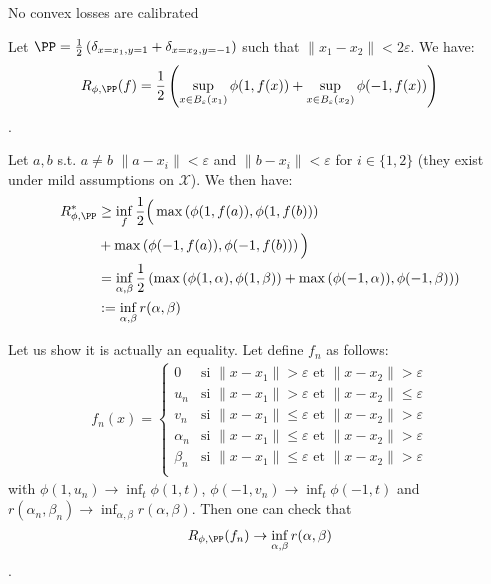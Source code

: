 \begin{prop}
No convex losses are calibrated
\end{prop}
\begin{prv*}

Let $\PP= \frac{1}{2}\left(\delta_{x=x_1,y=1}+\delta_{x=x_2,y=-1}\right)$ such that $\lVert x_1-x_2\rVert<2\varepsilon$. We have:
$$R_{\phi,\PP}(f) = \frac{1}{2}\left(\sup_{x\in B_\varepsilon(x_1)}\phi(1,f(x))+\sup_{x\in B_\varepsilon(x_2)}\phi(-1,f(x))\right)$$.

Let $a,b$ s.t. $a\neq b$  $\lVert a-x_i\rVert<\varepsilon$ and  $\lVert b-x_i\rVert<\varepsilon$ for $i\in\{1,2\}$ (they exist under mild assumptions on $\mathcal{X}$). We then have: 
\begin{align*}
R^*_{\phi,\PP} & \geq \inf_{f} \frac{1}{2}\Big(\max\left(\phi(1,f(a)),\phi(1,f(b))\right)\\
&+
\max\left(\phi(-1,f(a)),\phi(-1,f(b))\right)\Big)\\
&=  \inf_{\alpha,\beta} \frac{1}{2}\left(\max\left(\phi(1,\alpha),\phi(1,\beta)\right)+\max\left(\phi(-1,\alpha)),\phi(-1,\beta)\right)\right)\\
&:= \inf_{\alpha,\beta} r(\alpha,\beta)
\end{align*}

Let us show it is actually an equality. Let define $f_n$ as follows:
\begin{align*}
    f_n(x) = \left\{
    \begin{array}{ll}
        0 & \mbox{si } \lVert x-x_1\rVert >\varepsilon\mbox{ et } \lVert x-x_2\rVert >\varepsilon\\
        u_n & \mbox{si } \lVert x-x_1\rVert >\varepsilon\mbox{ et } \lVert x-x_2\rVert\leq \varepsilon\\
        v_n & \mbox{si } \lVert x-x_1\rVert \leq\varepsilon\mbox{ et } \lVert x-x_2\rVert> \varepsilon\\
        \alpha_n & \mbox{si } \lVert x-x_1\rVert \leq\varepsilon\mbox{ et } \lVert x-x_2\rVert> \varepsilon\\
        \beta_n & \mbox{si } \lVert x-x_1\rVert \leq\varepsilon\mbox{ et } \lVert x-x_2\rVert> \varepsilon\\
    \end{array}
\right.
\end{align*}
with $\phi(1,u_n)\to \inf_t \phi(1,t)$, $\phi(-1,v_n)\to \inf_t \phi(-1,t)$ and $r(\alpha_n,\beta_n)\to\inf_{\alpha,\beta} r(\alpha,\beta)$. Then one can check that $$R_{\phi,\PP}(f_n)\to \inf_{\alpha,\beta} r(\alpha,\beta)$$. 


\end{prv*}
